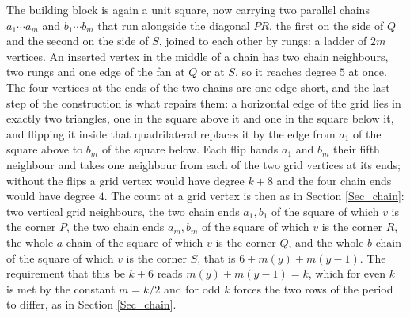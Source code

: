 \documentclass[12pt,a4paper]{article}%
\begin{document}
The building block is again a unit square, now carrying two parallel chains
$a_{1}\cdots a_{m}$ and $b_{1}\cdots b_{m}$ that run alongside the diagonal $PR$, the first on the
side of $Q$ and the second on the side of $S$, joined to each other by rungs: a ladder of $2m$
vertices. An inserted vertex in the middle of a chain has two chain neighbours, two rungs and one
edge of the fan at $Q$ or at $S$, so it reaches degree $5$ at once. The four vertices at the ends of
the two chains are one edge short, and the last step of the construction is what repairs them: a
horizontal edge of the grid lies in exactly two triangles, one in the square above it and one in the
square below it, and flipping it inside that quadrilateral replaces it by the edge from $a_{1}$ of the
square above to $b_{m}$ of the square below. Each flip hands $a_{1}$ and $b_{m}$ their fifth
neighbour and takes one neighbour from each of the two grid vertices at its ends; without the flips a
grid vertex would have degree $k+8$ and the four chain ends would have degree $4$. The count at a
grid vertex is then as in Section \ref{Sec_chain}: two vertical grid neighbours, the two chain ends
$a_{1},b_{1}$ of the square of which $v$ is the corner $P$, the two chain ends $a_{m},b_{m}$ of the
square of which $v$ is the corner $R$, the whole $a$-chain of the square of which $v$ is the corner
$Q$, and the whole $b$-chain of the square of which $v$ is the corner $S$, that is
$6+m(y)+m(y-1)$. The requirement that this be $k+6$ reads $m(y)+m(y-1)=k$, which for even $k$ is met
by the constant $m=k/2$ and for odd $k$ forces the two rows of the period to differ, as in Section
\ref{Sec_chain}.
\end{document}
